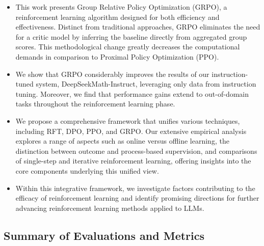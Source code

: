 \begin{itemize}[topsep=0pt]
    \item This work presents Group Relative Policy Optimization (GRPO), a reinforcement learning algorithm designed for both efficiency and effectiveness. Distinct from traditional approaches, GRPO eliminates the need for a critic model by inferring the baseline directly from aggregated group scores. This methodological change greatly decreases the computational demands in comparison to Proximal Policy Optimization (PPO).
    \item We show that GRPO considerably improves the results of our instruction-tuned system, DeepSeekMath-Instruct, leveraging only data from instruction tuning. Moreover, we find that performance gains extend to out-of-domain tasks throughout the reinforcement learning phase.
    \item We propose a comprehensive framework that unifies various techniques, including RFT, DPO, PPO, and GRPO. Our extensive empirical analysis explores a range of aspects such as online versus offline learning, the distinction between outcome and process-based supervision, and comparisons of single-step and iterative reinforcement learning, offering insights into the core components underlying this unified view.
    \item Within this integrative framework, we investigate factors contributing to the efficacy of reinforcement learning and identify promising directions for further advancing reinforcement learning methods applied to LLMs.
\end{itemize}

\subsection{Summary of Evaluations and Metrics}


